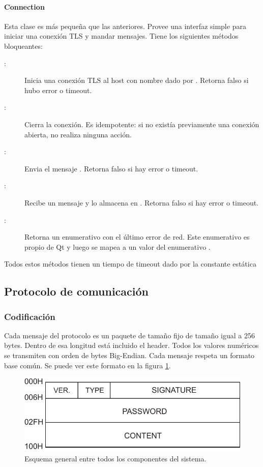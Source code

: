 \paragraph{Connection}
Esta clase es más pequeña que las anteriores. Provee una interfaz simple para iniciar una conexión TLS y mandar mensajes. Tiene los siguientes métodos bloqueantes:
\begin{description}
	\item[:] Inicia una conexión TLS al host con nombre dado por . Retorna falso si hubo error o timeout.
	\item[:] Cierra la conexión. Es idempotente: si no existía previamente una conexión abierta, no realiza ninguna acción.
	\item[:] Envia el mensaje . Retorna falso si hay error o timeout.
	\item[:] Recibe un mensaje y lo almacena en . Retorna falso si hay error o timeout.
	\item[:] Retorna un enumerativo con el último error de red. Este enumerativo es propio de Qt y luego se mapea a un valor del enumerativo .
\end{description}

Todos estos métodos tienen un tiempo de timeout dado por la constante estática 

\subsection{Protocolo de comunicación} \label{sec:protocolo}

\subsubsection{Codificación}

Cada mensaje del protocolo es un paquete de tamaño fijo de tamaño igual a 256 bytes.
Dentro de esa longitud está incluido el header.
Todos los valores numéricos se transmiten con orden de bytes Big-Endian.
Cada mensaje respeta un formato base común. Se puede ver este formato en la figura \ref{fig:paquete-base}.


\begin{figure}[!ht]
	\centering
	\includegraphics[width=0.6\linewidth]{imagenes/protocolo/paquete-base.pdf}
	\caption{Esquema general entre todos los componentes del sistema.}
	\label{fig:paquete-base}
\end{figure}

